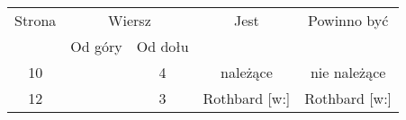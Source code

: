 \documentclass[a4paper,11pt]{article}
\begin{document}
\begin{center}

  \begin{tabular}{|c|c|c|c|c|}
    \hline
    Strona & \multicolumn{2}{c|}{Wiersz} & Jest
    & Powinno być \\ \cline{2-3}
    & Od góry & Od dołu & & \\
    \hline
    10  & &  4 & należące & nie należące \\
    12  & &  3 & Rothbard [w:] & Rothbard [w:] \\
    \hline
  \end{tabular}






\end{center}
\end{document}
